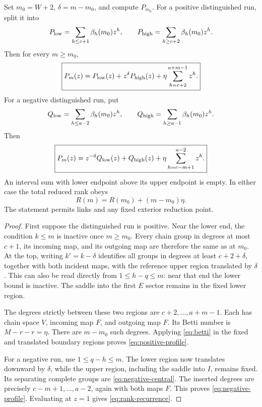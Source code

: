 \begin{theorem}\label{thm:recurrence}
Set \(m_0=W+2\), \(\delta=m-m_0\), and compute \(P_{m_0}\).
For a positive distinguished run, split it into
\[
P_{\rm low}=\sum_{h\le c+1}\beta_h(m_0)z^h,\qquad
P_{\rm high}=\sum_{h\ge c+2}\beta_h(m_0)z^h.
\]
Then for every \(m\ge m_0\),
\begin{equation}\label{eq:positive-profile}
\boxed{\displaystyle
P_m(z)=P_{\rm low}(z)+z^\delta P_{\rm high}(z)
       +\eta\sum_{h=c+2}^{a+m-1}z^h.}
\end{equation}
For a negative distinguished run, put
\[
Q_{\rm low}=\sum_{h\le a-2}\beta_h(m_0)z^h,\qquad
Q_{\rm high}=\sum_{h\ge a-1}\beta_h(m_0)z^h.
\]
Then
\begin{equation}\label{eq:negative-profile}
\boxed{\displaystyle
P_m(z)=z^{-\delta}Q_{\rm low}(z)+Q_{\rm high}(z)
       +\eta\sum_{h=c-m+1}^{a-2}z^h.}
\end{equation}
An interval sum with lower endpoint above its upper endpoint is empty.
In either case the total reduced rank obeys
\begin{equation}\label{eq:rank-recurrence}
R(m)=R(m_0)+(m-m_0)\eta.
\end{equation}
The statement permits links and any fixed exterior reduction point.
\end{theorem}

\begin{proof}
First suppose the distinguished run is positive. Near the lower end,
the condition \(k\le m\) is inactive once \(m\ge m_0\).
Every chain group in degrees at most \(c+1\), its incoming map, and its
outgoing map are therefore the same as at \(m_0\).
At the top, writing \(k'=k-\delta\) identifies all groups in degrees at
least \(c+2+\delta\), together with both incident maps, with the reference
upper region translated by \(\delta\). This can also be read directly
from \(1\le h-q\le m\): near that end the lower bound is inactive.
The saddle into the first \(E\) sector remains in the fixed lower region.

The degrees strictly between these two regions are
\(c+2,\ldots,a+m-1\). Each has chain space \(V\), incoming map \(F\),
and outgoing map \(F\). Its Betti number is \(M-r-r=\eta\).
There are \(m-m_0\) such degrees. Applying \eqref{eq:betti} in the fixed
and translated boundary regions proves \eqref{eq:positive-profile}.

For a negative run, use \(1\le q-h\le m\). The lower region now
translates downward by \(\delta\), while the upper region, including
the saddle into \(I\), remains fixed. Its separating complete groups
are \eqref{eq:negative-central}. The inserted degrees are precisely
\(c-m+1,\ldots,a-2\), again with both maps \(F\).
This proves \eqref{eq:negative-profile}. Evaluating at \(z=1\) gives
\eqref{eq:rank-recurrence}.
\end{proof}

